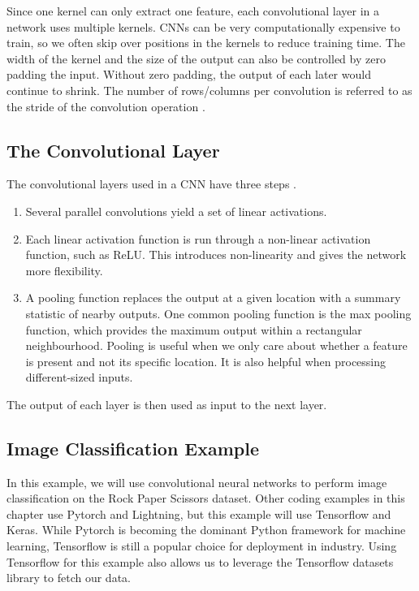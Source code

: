 \documentclass{article}
\begin{document}
Since one kernel can only extract one feature, each convolutional layer in a network uses multiple kernels. CNNs can be very computationally expensive to train, so we often skip over positions in the kernels to reduce training time. The width of the kernel and the size of the output can also be controlled by zero padding the input. Without zero padding, the output of each later would continue to shrink. The number of rows/columns per convolution is referred to as the stride of the convolution operation \cite{Goodfellow-et-al-2016}. %

\subsection{The Convolutional Layer}

The convolutional layers used in a CNN have three steps \cite{Goodfellow-et-al-2016}.

\begin{enumerate}
    \item Several parallel convolutions yield a set of linear activations.
    \item Each linear activation function is run through a non-linear activation function, such as ReLU. This introduces non-linearity and gives the network more flexibility. %
    \item A pooling function replaces the output at a given location with a summary statistic of nearby outputs. One common pooling function is the max pooling function, which provides the maximum output within a rectangular neighbourhood. Pooling is useful when we only care about whether a feature is present and not its specific location. It is also helpful when processing different-sized inputs.
\end{enumerate}

The output of each layer is then used as input to the next layer.

\subsection{Image Classification Example}

In this example, we will use convolutional neural networks to perform image classification on the Rock Paper Scissors dataset. Other coding examples in this chapter use Pytorch and Lightning, but this example will use Tensorflow and Keras. While Pytorch is becoming the dominant Python framework for machine learning, Tensorflow is still a popular choice for deployment in industry. Using Tensorflow for this example also allows us to leverage the Tensorflow datasets library to fetch our data.
\end{document}
